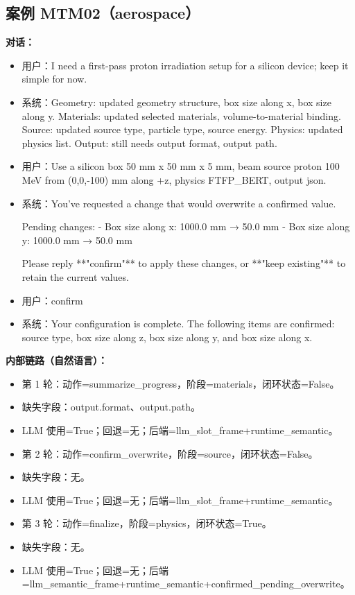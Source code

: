 \documentclass[11pt]{ctexart}
\begin{document}
\subsection{案例 MTM02（aerospace）}
\textbf{对话：}
\begin{itemize}
\item 用户：I need a first-pass proton irradiation setup for a silicon device; keep it simple for now.
\item 系统：Geometry: updated geometry structure, box size along x, box size along y. Materials: updated selected materials, volume-to-material binding. Source: updated source type, particle type, source energy. Physics: updated physics list. Output: still needs output format, output path.
\item 用户：Use a silicon box 50 mm x 50 mm x 5 mm, beam source proton 100 MeV from (0,0,-100) mm along +z, physics FTFP\_BERT, output json.
\item 系统：You've requested a change that would overwrite a confirmed value.

Pending changes:
- Box size along x: 1000.0 mm → 50.0 mm
- Box size along y: 1000.0 mm → 50.0 mm

Please reply **"confirm"** to apply these changes, or **"keep existing"** to retain the current values.
\item 用户：confirm
\item 系统：Your configuration is complete. The following items are confirmed: source type, box size along z, box size along y, and box size along x.
\end{itemize}
\textbf{内部链路（自然语言）：}
\begin{itemize}
\item 第 1 轮：动作=summarize\_progress，阶段=materials，闭环状态=False。
\item 缺失字段：output.format、output.path。
\item LLM 使用=True；回退=无；后端=llm\_slot\_frame+runtime\_semantic。
\item 第 2 轮：动作=confirm\_overwrite，阶段=source，闭环状态=False。
\item 缺失字段：无。
\item LLM 使用=True；回退=无；后端=llm\_slot\_frame+runtime\_semantic。
\item 第 3 轮：动作=finalize，阶段=physics，闭环状态=True。
\item 缺失字段：无。
\item LLM 使用=True；回退=无；后端=llm\_semantic\_frame+runtime\_semantic+confirmed\_pending\_overwrite。
\end{itemize}
\end{document}
